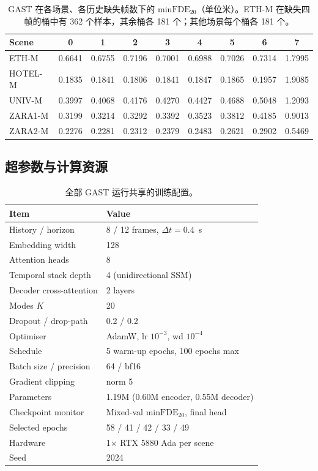 \begin{table}[t]
\centering
\scriptsize
\setlength{\tabcolsep}{1.0pt}
\caption{GAST 在各场景、各历史缺失帧数下的 $\mathrm{minFDE}_{20}$（单位米）。ETH-M 在缺失四帧的桶中有 362 个样本，其余桶各 181 个；其他场景每个桶各 181 个。}
\label{tab:appstrat}
\begin{tabular}{@{}lcccccccc@{}}
\toprule
Scene & 0 & 1 & 2 & 3 & 4 & 5 & 6 & 7 \\
\midrule
ETH-M   & 0.6641 & 0.6755 & 0.7196 & 0.7001 & 0.6988 & 0.7026 & 0.7314 & 1.7995 \\
HOTEL-M & 0.1835 & 0.1841 & 0.1806 & 0.1841 & 0.1847 & 0.1865 & 0.1957 & 1.9085 \\
UNIV-M  & 0.3997 & 0.4068 & 0.4176 & 0.4270 & 0.4427 & 0.4688 & 0.5048 & 1.2093 \\
ZARA1-M & 0.3199 & 0.3214 & 0.3292 & 0.3392 & 0.3523 & 0.3812 & 0.4185 & 0.9013 \\
ZARA2-M & 0.2276 & 0.2281 & 0.2312 & 0.2379 & 0.2483 & 0.2621 & 0.2902 & 0.5469 \\
\bottomrule
\end{tabular}
\end{table}

\subsection{超参数与计算资源}
\label{app:hparams}

\begin{table}[t]
\centering
\scriptsize
\setlength{\tabcolsep}{2.4pt}
\caption{全部 GAST 运行共享的训练配置。}
\label{tab:hparams}
\begin{tabular}{@{}ll@{}}
\toprule
Item & Value \\
\midrule
History / horizon & 8 / 12 frames, $\Delta t=0.4$~s \\
Embedding width & 128 \\
Attention heads & 8 \\
Temporal stack depth & 4 (unidirectional SSM) \\
Decoder cross-attention & 2 layers \\
Modes $K$ & 20 \\
Dropout / drop-path & 0.2 / 0.2 \\
Optimiser & AdamW, lr $10^{-3}$, wd $10^{-4}$ \\
Schedule & 5 warm-up epochs, 100 epochs max \\
Batch size / precision & 64 / bf16 \\
Gradient clipping & norm 5 \\
Parameters & 1.19M (0.60M encoder, 0.55M decoder) \\
Checkpoint monitor & Mixed-val $\mathrm{minFDE}_{20}$, final head \\
Selected epochs & 58 / 41 / 42 / 33 / 49 \\
Hardware & 1$\times$ RTX 5880 Ada per scene \\
Seed & 2024 \\
\bottomrule
\end{tabular}
\end{table}

